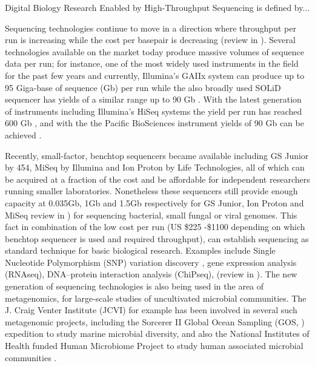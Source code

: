 \documentclass[10pt]{bmc_article}
\newenvironment{bmcformat}{\begin{raggedright}\baselineskip20pt\sloppy\setboolean{publ}{false}}{\end{raggedright}\baselineskip20pt\sloppy}
\begin{document}
\begin{bmcformat}
      Digital Biology Research Enabled by High-Throughput Sequencing is defined by... \pb
             
      Sequencing technologies continue to move in a direction where throughput per run is
      increasing while the cost per basepair is decreasing (review in \cite{Mason2012}). 
      Several technologies available on the market today produce massive volumes of sequence data per
      run; for instance, one of the most widely used instruments in the field for the past few years
      and currently, Illumina's GAIIx system can produce up to 95 Giga-base of sequence (Gb) per run 
      \cite{Illumina} while the also broadly used SOLiD sequencer has yields of a similar range 
      up to 90 Gb \cite{solid5500}. With the latest generation of instruments including Illumina’s 
      HiSeq systems the yield per run has reached 600 Gb \cite{Illumina}, and with the the Pacific 
      BioSciences instrument yields of 90 Gb can be achieved \cite{}. \pb
      
      Recently, small-factor, benchtop sequencers became available including GS Junior by 454, 
      MiSeq by Illumina and Ion Proton by Life Technologies, all of which can be acquired at a fraction 
      of the cost and be affordable for independent researchers running smaller laboratories. Nonetheless 
      these sequencers still provide enough capacity at 0.035Gb, 1Gb and 1.5Gb respectively for GS Junior, 
      Ion Proton and MiSeq review in \cite{Loman2012}) for sequencing bacterial, small fungal or viral genomes. 
      This fact in combination of the low cost per run (US \$225 -\$1100 depending on which benchtop 
      sequencer is used and required throughput), can establish sequencing as standard technique for
      basic biological research. Examples include Single Nucleotide Polymorphism (SNP) 
      variation discovery , gene expression analysis (RNAseq), DNA–protein interaction analysis 
      (ChiPseq), (review in \cite{Mardis2008}). The new generation of sequencing technologies is also being 
      used in the area of metagenomics, for large-scale studies of uncultivated microbial communities. 
      The J. Craig Venter Institute (JCVI) for example has been involved in several such metagenomic 
      projects, including the Sorcerer II Global Ocean Sampling (GOS, \cite{Nelson2010}) expedition to study marine 
      microbial diversity, and also the National Institutes of Health funded Human Microbiome Project 
      to study human associated microbial communities \cite{Rusch2007}. \pb
      


\end{bmcformat}
\end{document}
